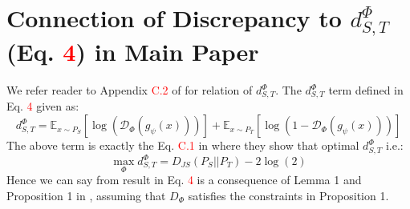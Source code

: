 \documentclass[table,dvipsnames]{article}
\theoremstyle{plain}
\theoremstyle{definition}
\theoremstyle{remark}
\begin{document}
\section{Connection of Discrepancy to $d_{S,T}^\Phi$ (Eq. \textcolor{red}{4}) in Main Paper}\label{app:discrepancy}
We refer reader to Appendix \textcolor{red}{C.2} of \citet{acuna2021f} for relation of $d_{S,T}^\Phi$. The $d_{S,T}^\Phi$ term defined in Eq. \textcolor{red}{4} given as:
\begin{equation}
    d_{S,T}^{\Phi} = \mathbb{E}_{x \sim P_S}[\log(\mathcal{D}_{\Phi}(g_{\psi}(x)))] + \mathbb{E}_{x \sim P_T}[ \log(1-\mathcal{D}_{\Phi}(g_{\psi}(x)))]
\end{equation}
The above term is exactly the Eq. \textcolor{red}{C.1} in \citet{acuna2021f} where they show that optimal $d_{S,T}^\Phi$ i.e.:
\begin{equation}
    \max_{\Phi} d_{S,T}^{\Phi} = D_{JS}(P_S||P_T) - 2\log(2)
\end{equation}
Hence we can say from result in Eq. \textcolor{red}{4} is a consequence of Lemma 1 and Proposition 1 in \citep{acuna2021f}, assuming that $D_{\Phi}$ satisfies the constraints in Proposition 1.
\end{document}

